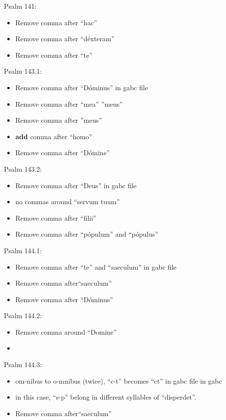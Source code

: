\documentclass[11pt]{article}
\begin{document}
Psalm 141:
  \begin{itemize}
  \item Remove comma after ``hac''
  \item  Remove comma after ``déxteram''
    \item  Remove comma after ``te''

    \end{itemize}

      Psalm 143.1:
  \begin{itemize}
  \item Remove comma after ``Dóminus'' in gabc file
  \item  Remove comma after ``mea'' ''meus''
    \item  Remove comma after ''meus''
    \item
    \textbf{add} comma after ``homo''
      \item  Remove comma after ``Dómine'' 
    \end{itemize}

 Psalm 143.2:
  \begin{itemize}
  \item Remove comma after ``Deus'' in gabc file
    \item  no commas around ``servum tuum''
      \item Remove comma after ``filii'' 
   \item Remove comma after ``pópulum'' and ``pópulus'' 
    \end{itemize}

      Psalm 144.1:
  \begin{itemize}
    \item Remove comma after ``te''  and ``saeculum'' in gabc file 
  \item   Remove comma after``saeculum''
    \item Remove comma after ``Dóminus'' 
    \end{itemize}

 Psalm 144.2:
  \begin{itemize}
  \item Remove comma around ``Domine''
  \item  
    \end{itemize}

 Psalm 144.3:
  \begin{itemize}
  \item om-nibus to o-mnibus (twice),  ``c-t'' becomes ``ct'' in gabc file in gabc
     \item in this case, ``s-p'' belong in different syllables of ``disperdet''.
  \item  Remove comma after``saeculum''
    \end{itemize}
\end{document}
